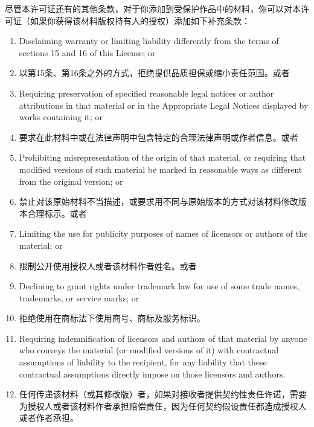 \documentclass[11pt]{article}
\begin{document}
\begin{enumerate}
尽管本许可证还有的其他条款，对于你添加到受保护作品中的材料，你可以对本许可证（如果你获得该材料版权持有人的授权）添加如下补充条款：

  \begin{enumerate}
  \item Disclaiming warranty or limiting liability differently from the
  terms of sections 15 and 16 of this License; or

  \item 以第15条、第16条之外的方式，拒绝提供品质担保或缩小责任范围。或者

  \item Requiring preservation of specified reasonable legal notices or
  author attributions in that material or in the Appropriate Legal
  Notices displayed by works containing it; or

  \item 要求在此材料中或在法律声明中包含特定的合理法律声明或作者信息。或者
  
  \item Prohibiting misrepresentation of the origin of that material, or
  requiring that modified versions of such material be marked in
  reasonable ways as different from the original version; or

  \item 禁止对该原始材料不当描述，或要求用不同与原始版本的方式对该材料修改版本合理标示。或者
  
  \item Limiting the use for publicity purposes of names of licensors or
  authors of the material; or

  \item 限制公开使用授权人或者该材料作者姓名。或者

  \item Declining to grant rights under trademark law for use of some
  trade names, trademarks, or service marks; or

  \item 拒绝使用在商标法下使用商号、商标及服务标识。

  \item Requiring indemnification of licensors and authors of that
  material by anyone who conveys the material (or modified versions of
  it) with contractual assumptions of liability to the recipient, for
  any liability that these contractual assumptions directly impose on
  those licensors and authors.

  \item 任何传递该材料（或其修改版）者，如果对接收者提供契约性责任许诺，需要为授权人或者该材料作者承担赔偿责任，因为任何契约假设责任都造成授权人或者作者承担。
  \end{enumerate}


\end{enumerate}
\end{document}

